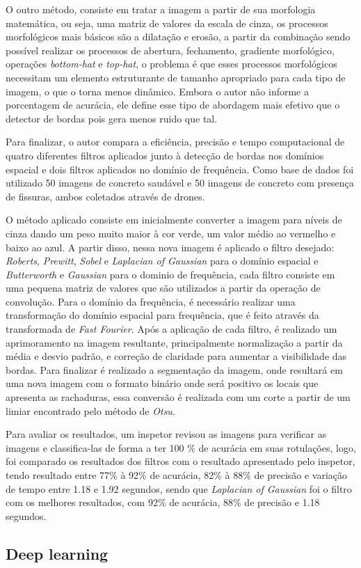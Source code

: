O outro método, consiste em tratar a imagem a partir de sua morfologia matemática, ou seja, uma matriz de valores da escala de cinza, os processos morfológicos mais básicos são a dilatação e erosão, a partir da combinação sendo possível realizar os processos de abertura, fechamento, gradiente morfológico, operações \textit{bottom-hat} e \textit{top-hat}, o problema é que esses processos morfológicos necessitam um elemento estruturante de tamanho apropriado para cada tipo de imagem, o que o torna menos dinâmico. Embora o autor não informe a porcentagem de acurácia, ele define esse tipo de abordagem mais efetivo que o detector de bordas pois gera menos ruido que tal.

Para finalizar, o autor  compara a eficiência, precisão e tempo computacional de quatro diferentes filtros aplicados junto à detecção de bordas nos domínios espacial e dois filtros aplicados no domínio de frequência. Como base de dados foi utilizado 50 imagens de concreto saudável e 50 imagens de concreto com presença de fissuras, ambos coletados através de drones. 

O método aplicado consiste em inicialmente converter a imagem para níveis de cinza dando um peso muito maior à cor verde, um valor médio ao vermelho e baixo ao azul. %
A partir disso, nessa nova imagem é aplicado o filtro desejado: \textit{Roberts}, \textit{Prewitt}, \textit{Sobel} e \textit{Laplacian of Gaussian} para o domínio espacial e \textit{Butterworth} e \textit{Gaussian} para o dominio de frequência, cada filtro consiste em uma pequena matriz de valores que são utilizados a partir da operação de convolução.
Para o domínio da frequência, é necessário realizar uma transformação do domínio espacial para frequência, que é feito através da transformada de \textit{Fast Fourier}. Após a aplicação de cada filtro, é realizado um aprimoramento na imagem resultante, principalmente normalização a partir da média e desvio padrão, e correção de claridade para aumentar a visibilidade das bordas. Para finalizar é realizado a segmentação da imagem, onde resultará em uma nova imagem com o formato binário onde será positivo os locais que apresenta as rachaduras, essa conversão é realizada com um corte a partir de um limiar encontrado pelo método de \textit{Otsu}.

Para avaliar os resultados, um inspetor revisou as imagens para verificar as imagens e classifica-las de forma a ter 100 \% de acurácia em suas rotulações, logo, foi comparado os resultados dos filtros com o resultado apresentado pelo inspetor, tendo resultado entre 77\% à 92\% de acurácia, 82\% à 88\% de precisão e variação de tempo entre 1.18 e 1.92 segundos, sendo que \textit{Laplacian of Gaussian} foi o filtro com os melhores resultados, com 92\% de acurácia, 88\% de precisão e 1.18 segundos.

\subsection{Deep learning}

